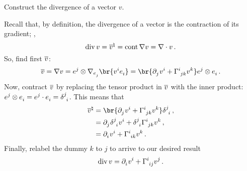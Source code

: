Construct the divergence of a vector $v$.

Recall that, by definition, the divergence of a vector is the contraction of its gradient; \ie,
%
\begin{equation*}
  \operatorname{div} v = {\overline{v}}^{\natural}
  = \operatorname{cont}\nabla v
  = \nabla\cdot v\,.
\end{equation*}
%
So, find first $\overline{v}$:
%
\begin{equation*}
  \grad v = \ograd v
  = \tbcov j\tprod\ocder{\tbvec j}\br{\tvec vi\tbvec i}
  = \br{\cpd j\tvec vi + \tchris ijk\tvec vk}\tbcov j\tprod\tbvec i\,.
\end{equation*}
%
Now, contract $\overline{v}$ by replacing the tensor product in $\overline{v}$ with the inner product: $\tbcov j\tprod\tbvec i = \tbcov j\iprod\tbvec i = \tkron ji$. This means that
%
\begin{align*}
  \cont{\grad v} &= \br{\cpd j\tvec vi + \tchris ijk\tvec vk}\tkron ji\,,\\
  &= \cpd j\tkron ji\tvec vi + \tkron ji\tchris ijk\tvec vk \,,\\
  &= \cpd i\tvec vi + \tchris iik\tvec vk \,.
\end{align*}
%
Finally, relabel the dummy $k$ to $j$ to arrive to our desired result
%
\begin{equation*}
  \vdiv v = \cpd i\tvec vi + \tchris iij\tvec vj \,.
\end{equation*}
